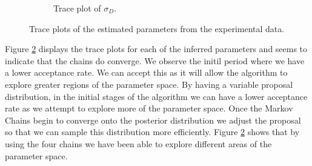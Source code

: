 \begin{figure}[h!]
\begin{subfigure}{.5\textwidth}
  \caption{Trace plot of $\sigma_D$.}
  \label{fig:subtpsigmad}
\end{subfigure}
    \caption{Trace plots of the estimated parameters from the experimental data.}%
    \label{fig:EXP_TP}%
\end{figure}%

Figure \ref{fig:EXP_TP} displays the trace plots for each of the inferred parameters and seems to indicate that the chains do converge. We observe the initil period where we have a lower acceptance rate. We can accept this as it will allow the algorithm to explore greater regions of the parameter space. By having a variable proposal distribution, in the initial stages of the algorithm we can have a lower acceptance rate as we attempt to explore more of the parameter space. Once the Markov Chains begin to converge onto the posterior distribution we adjust the proposal so that we can sample this distribution more efficiently. Figure \ref{fig:EXP_TP} shows that by using the four chains we have been able to explore different areas of the parameter space.


